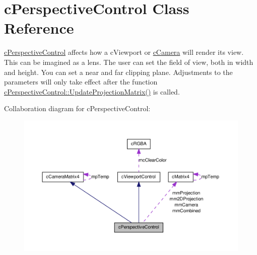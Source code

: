 \hypertarget{classc_perspective_control}{
\section{cPerspectiveControl Class Reference}
\label{classc_perspective_control}
}


\hyperlink{classc_perspective_control}{cPerspectiveControl} affects how a cViewport or \hyperlink{classc_camera}{cCamera} will render its view. This can be imagined as a lens. The user can set the field of view, both in width and height. You can set a near and far clipping plane. Adjustments to the parameters will only take effect after the function \hyperlink{classc_perspective_control_a21f71c817289e0f250dbe9fa83f269bd}{cPerspectiveControl::UpdateProjectionMatrix()} is called.  




Collaboration diagram for cPerspectiveControl:\nopagebreak
\begin{figure}[H]
\begin{center}
\leavevmode
\includegraphics[width=400pt]{classc_perspective_control__coll__graph}
\end{center}
\end{figure}

